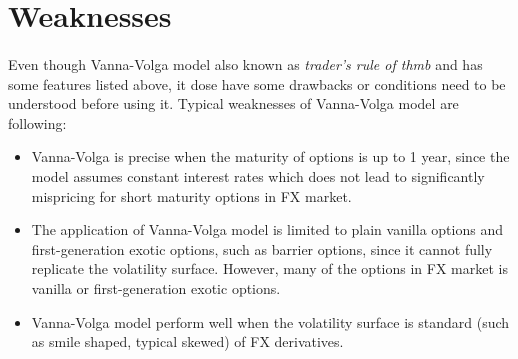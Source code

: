 \section{Weaknesses}
\paragraph{}
Even though Vanna-Volga model also known as \textit{trader's rule of thmb} and has some features listed above, it dose have some drawbacks or conditions need to be understood before using it. Typical weaknesses of Vanna-Volga model are following:

\begin{itemize}
	\item Vanna-Volga is precise when the maturity of options is up to 1 year, since the model assumes constant interest rates which does not lead to significantly mispricing for short maturity options in FX market.
	\item The application of Vanna-Volga model is limited to plain vanilla options and first-generation exotic options, such as barrier options, since it cannot fully replicate the volatility surface. However, many of the options in FX market is vanilla or first-generation exotic options.
	\item Vanna-Volga model perform well when the volatility surface is standard (such as smile shaped, typical skewed) of FX derivatives.
\end{itemize}


